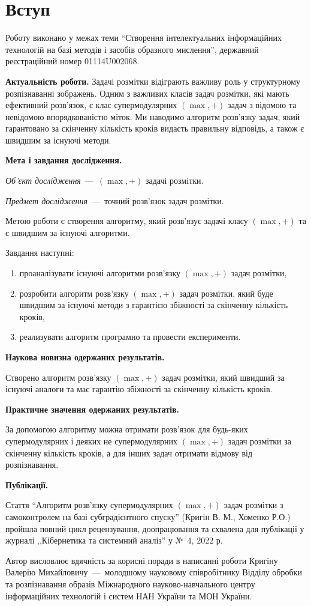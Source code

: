 \chapter*{Вступ}

Роботу виконано у межах теми ``Створення інтелектуальних інформаційних
технологій на базі методів і засобів образного мислення'',
державний реєстраційний номер 01114U002068.

\textbf{Актуальність роботи.}
Задачі розмітки відіграють важливу роль у структурному розпізнаванні
зображень. Одним з важливих класів задач
розмітки, які мають ефективний розв’язок, є клас супермодулярних
\((\max,+)\) задач з відомою  та невідомою впорядкованістю міток.
Ми наводимо алгоритм розв'язку задач, який гарантовано за скінченну кількість
кроків видасть правильну відповідь, а також є швидшим за існуючі методи.

\textbf{Мета і завдання дослідження.}

\textit{Об'єкт дослідження}~---~\((\max,+)\) задачі розмітки.

\textit{Предмет дослідження}~---~точний розв’язок задач розмітки.

Метою роботи є створення алгоритму, який розв'язує задачі класу
\((\max,+)\) та є швидшим за існуючі алгоритми.

Завдання наступні:
\begin{enumerate}
  \item
    проаналізувати існуючі алгоритми розв'язку \((\max,+)\) задач розмітки,
  \item
    розробити алгоритм розв'язку \((\max,+)\) задач розмітки, який буде
    швидшим за існуючі методи з гарантією збіжності за скінченну
    кількість кроків,
  \item
    реализувати алгоритм програмно та провести експерименти.
\end{enumerate}

\textbf{Наукова новизна одержаних результатів.}

Створено алгоритм розв'язку \((\max,+)\) задач розмітки, який швидший за
існуючі аналоги та має гарантію збіжності за скінченну кількість кроків.

\textbf{Практичне значення одержаних результатів.}

За допомогою алгоритму можна отримати розв'язок для будь-яких
супермодулярних і деяких не супермодулярних \((\max,+)\) задач розмітки
за скінченну кількість кроків,
а для інших задач отримати відмову від розпізнавання.

\textbf{Публікації.}

Стаття ``Алгоритм розв'язку супермодулярних $(\max, +)$ задач
розмітки з самоконтролем на базі субградієнтного спуску'' (Кригін В. М., Хоменко Р.О.)
пройшла повний цикл рецензування, доопрацювання та схвалена для
публікації у журналі
,,Кібернетика та системний аналіз'' у № 4, 2022 р.

Автор висловлює вдячність за корисні поради в написанні роботи Кригіну Валерію Михайловичу~---~молодшому
науковому співробітнику Відділу обробки та розпізнавання
образів Міжнародного науково-навчального центру інформаційних
технологій і систем НАН України та МОН України.